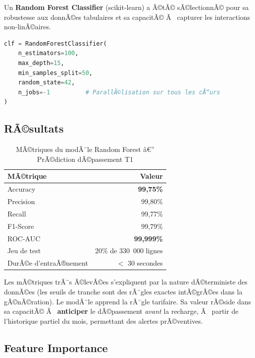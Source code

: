 \documentclass[12pt,a4paper]{report}
\begin{document}
Un \textbf{Random Forest Classifier} (scikit-learn) a Ã©tÃ© sÃ©lectionnÃ© pour sa robustesse aux donnÃ©es tabulaires et sa capacitÃ© Ã  capturer les interactions non-linÃ©aires.

\begin{codebox}
\begin{lstlisting}[language=Python, numbers=none]
clf = RandomForestClassifier(
    n_estimators=100,
    max_depth=15,
    min_samples_split=50,
    random_state=42,
    n_jobs=-1          # ParallÃ©lisation sur tous les cÅ“urs
)
\end{lstlisting}
\end{codebox}

\subsection{RÃ©sultats}

\begin{table}[h!]
\centering
\caption{MÃ©triques du modÃ¨le Random Forest â€” PrÃ©diction dÃ©passement T1}
\label{tab:ml}
\begin{tabularx}{0.65\textwidth}{l r}
\toprule
\rowcolor{marine!10}
MÃ©trique & Valeur \\
\midrule
Accuracy  & \textbf{99,75\%} \\
Precision & 99,80\% \\
Recall    & 99,77\% \\
F1-Score  & 99,79\% \\
ROC-AUC   & \textbf{99,999\%} \\
\midrule
Jeu de test & 20\% de 330~000 lignes \\
DurÃ©e d'entraÃ®nement & $<$ 30 secondes \\
\bottomrule
\end{tabularx}
\end{table}

\begin{infobox}
Les mÃ©triques trÃ¨s Ã©levÃ©es s'expliquent par la nature dÃ©terministe des donnÃ©es (les seuils de tranche sont des rÃ¨gles exactes intÃ©grÃ©es dans la gÃ©nÃ©ration). Le modÃ¨le apprend la rÃ¨gle tarifaire. Sa valeur rÃ©side dans sa capacitÃ© Ã  \textbf{anticiper} le dÃ©passement \textit{avant} la recharge, Ã  partir de l'historique partiel du mois, permettant des alertes prÃ©ventives.
\end{infobox}

\subsection{Feature Importance}
\end{document}
